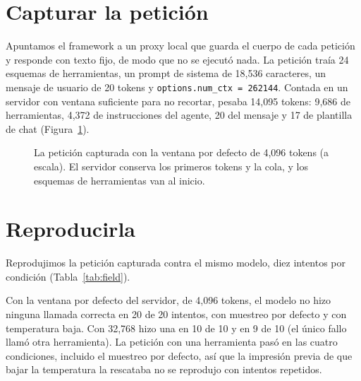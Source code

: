 \documentclass[10pt]{article}
\begin{document}
\section{Capturar la petición}

Apuntamos el framework a un proxy local que guarda el cuerpo de cada petición y responde con texto fijo, de modo que no se ejecutó nada. La petición traía 24 esquemas de herramientas, un prompt de sistema de 18,536 caracteres, un mensaje de usuario de 20 tokens y \texttt{options.num\_ctx = 262144}. Contada en un servidor con ventana suficiente para no recortar, pesaba 14,095 tokens: 9,686 de herramientas, 4,372 de instrucciones del agente, 20 del mensaje y 17 de plantilla de chat (Figura~\ref{fig:bar}).

\begin{figure}[H]
\centering
{}
\caption{La petición capturada con la ventana por defecto de 4,096 tokens (a escala). El servidor conserva los primeros tokens y la cola, y los esquemas de herramientas van al inicio.}
\label{fig:bar}
\end{figure}

\section{Reproducirla}

Reprodujimos la petición capturada contra el mismo modelo, diez intentos por condición (Tabla~\ref{tab:field}).

\fieldtable

Con la ventana por defecto del servidor, de 4,096 tokens, el modelo no hizo ninguna llamada correcta en 20 de 20 intentos, con muestreo por defecto y con temperatura baja. Con 32,768 hizo una en 10 de 10 y en 9 de 10 (el único fallo llamó otra herramienta). La petición con una herramienta pasó en las cuatro condiciones, incluido el muestreo por defecto, así que la impresión previa de que bajar la temperatura la rescataba no se reprodujo con intentos repetidos.
\end{document}
